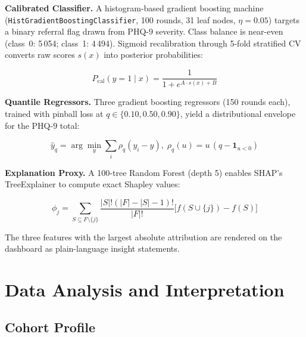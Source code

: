 \documentclass[conference]{IEEEtran}
\begin{document}
\textbf{Calibrated Classifier.} A histogram-based gradient boosting machine (\texttt{HistGradientBoostingClassifier}, 100 rounds, 31 leaf nodes, $\eta = 0.05$) targets a binary referral flag drawn from PHQ-9 severity. Class balance is near-even (class~0: 5\,054; class~1: 4\,494). Sigmoid recalibration \cite{platt1999calibration} through 5-fold stratified CV converts raw scores $s(x)$ into posterior probabilities:

\begin{equation}
P_{\text{cal}}(y{=}1 \mid x) = \frac{1}{1 + e^{A \cdot s(x) + B}}
\label{eq:platt}
\end{equation}

\textbf{Quantile Regressors.} Three gradient boosting regressors (150 rounds each), trained with pinball loss \cite{meinshausen2006quantile} at $q \in \{0.10, 0.50, 0.90\}$, yield a distributional envelope for the PHQ-9 total:

\begin{equation}
\hat{y}_q = \arg\min_y \sum_i \rho_q(y_i - y),\; \rho_q(u) = u\,(q - \mathbf{1}_{u<0})
\label{eq:quantile}
\end{equation}

\textbf{Explanation Proxy.} A 100-tree Random Forest (depth 5) enables SHAP's TreeExplainer \cite{lundberg2017shap} to compute exact Shapley values:

\begin{equation}
\phi_j = \!\!\sum_{S \subseteq F \setminus \{j\}} \frac{|S|!(|F|{-}|S|{-}1)!}{|F|!}\big[f(S {\cup} \{j\}) - f(S)\big]
\label{eq:shap}
\end{equation}

The three features with the largest absolute attribution are rendered on the dashboard as plain-language insight statements.

\section{Data Analysis and Interpretation}

\subsection{Cohort Profile}
\end{document}
